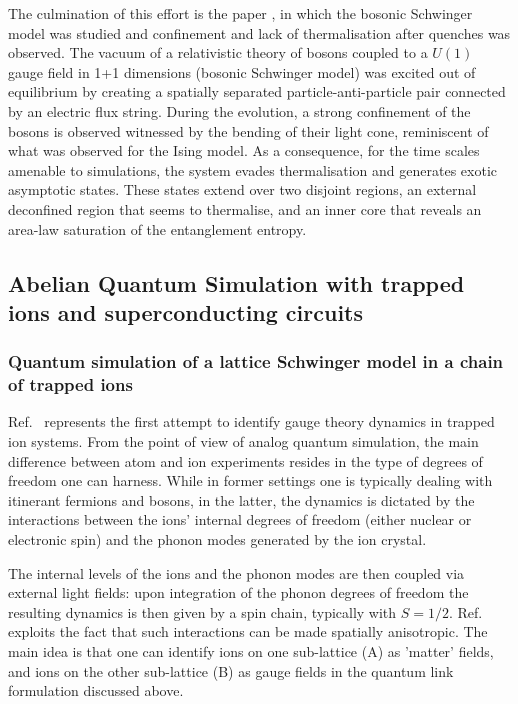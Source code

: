 \documentclass[epj,final]{svjour}
\begin{document}
The culmination of this effort is the paper \cite{CZL19}, in which the bosonic Schwinger model was studied and confinement and lack of thermalisation after quenches was observed. The vacuum of a relativistic theory of bosons coupled to a $U(1)$ gauge field in 1+1 dimensions (bosonic Schwinger model) was excited out of equilibrium by creating a spatially separated particle-anti-particle pair connected by an electric flux string. During the evolution, a strong confinement of the bosons is observed witnessed by the bending of their light cone, reminiscent of what was observed for the Ising model. As a consequence, for the time scales amenable to simulations, the system evades thermalisation and generates exotic asymptotic states. These states extend over two disjoint regions, an external deconfined region that seems to thermalise, and an inner core that reveals an area-law saturation of the entanglement entropy.

\subsection{Abelian Quantum Simulation with trapped ions and superconducting circuits}

\subsubsection{Quantum simulation of a lattice Schwinger model in a chain of trapped ions\cite{hauke2013quantum}}

Ref.~\cite{hauke2013quantum} represents the first attempt to identify gauge theory dynamics in trapped ion systems. From the point of view of analog quantum simulation, the main difference between atom and ion experiments resides in the type of degrees of freedom one can harness. While in former settings one is typically dealing with itinerant fermions and bosons, in the latter, the dynamics is dictated by the interactions between the ions' internal degrees of freedom (either nuclear or electronic spin) and the phonon modes generated by the ion crystal. 

The internal levels of the ions and the phonon modes are then coupled via external light fields: upon integration of the phonon degrees of freedom the resulting dynamics is then given by a spin chain, typically with $S=1/2$. Ref.~\cite{hauke2013quantum} exploits the fact that such interactions can be made spatially anisotropic. The main idea is that one can identify ions on one sub-lattice (A) as 'matter' fields, and ions on the other sub-lattice (B) as gauge fields in the quantum link formulation discussed above.
\end{document}
